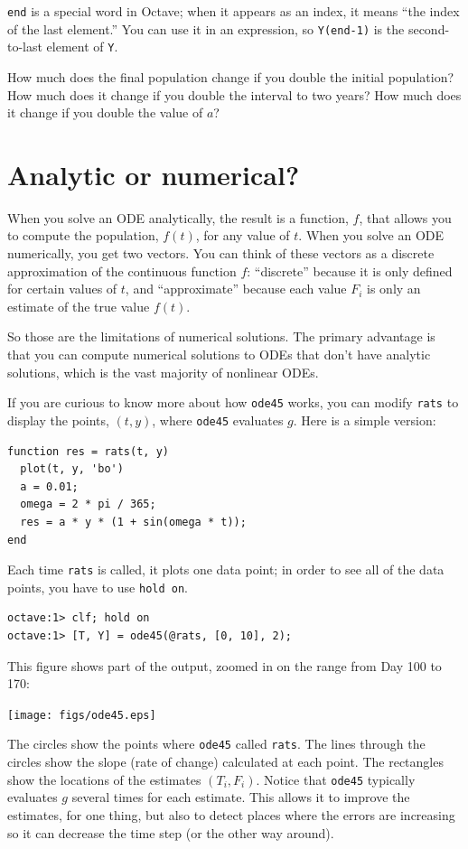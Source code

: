 \documentclass{book}
\begin{document}
{\tt end} is a special word in Octave; when it appears as an index,
it means ``the index of the last element.'' You can use it in an
expression, so {\tt Y(end-1)} is the second-to-last element of
{\tt Y}.

How much does the final population change if you double the initial
population? How much does it change if you double the interval
to two years? How much does it change if you double the value
of $a$?


\section{Analytic or numerical?}

When you solve an ODE analytically, the result is a function, $f$,
that allows you to compute the population, $f(t)$, for any value of
$t$. When you solve an ODE numerically, you get two vectors. You can
think of these vectors as a discrete approximation of the continuous
function $f$: ``discrete'' because it is only defined for certain
values of $t$, and ``approximate'' because each value $F_i$
is only an estimate of the true value $f(t)$.

So those are the limitations of numerical solutions. The primary
advantage is that you can compute numerical solutions to ODEs that
don't have analytic solutions, which is the vast majority
of nonlinear ODEs.

If you are curious to know more about how {\tt ode45} works, you
can modify {\tt rats} to display the points, $(t, y)$, where
{\tt ode45} evaluates $g$. Here is a simple version:

\begin{verbatim}
function res = rats(t, y)
  plot(t, y, 'bo')
  a = 0.01;
  omega = 2 * pi / 365;
  res = a * y * (1 + sin(omega * t));
end
\end{verbatim}

Each time {\tt rats} is called, it plots one data point; in order
to see all of the data points, you have to use {\tt hold on}.

\begin{verbatim}
octave:1> clf; hold on
octave:1> [T, Y] = ode45(@rats, [0, 10], 2);
\end{verbatim}

This figure shows part of the output, zoomed
in on the range from Day 100 to 170:

\beforefig \centerline{\texttt{[image: figs/ode45.eps]}}

The circles show the points where {\tt ode45} called {\tt rats}.
The lines through the circles show the slope (rate of change) calculated
at each point. The rectangles show the locations of the estimates
$(T_i, F_i)$. Notice that {\tt ode45} typically evaluates
$g$ several times for each estimate. This allows it to improve the
estimates, for one thing, but also to detect places where the errors
are increasing so it can decrease the time step (or the other
way around).
\end{document}
